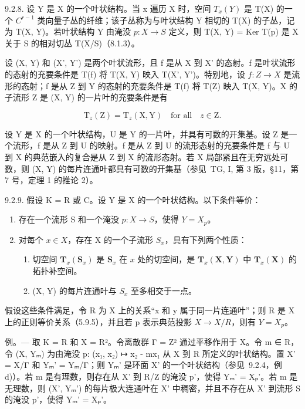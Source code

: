 9.2.8. 设 Y 是 X 的一个叶状结构。当 x 遍历 X 时，空间 \(T_{x}(Y)\) 是 T(X) 的一个 \(C^{r-1}\) 类向量子丛的纤维；该子丛称为与叶状结构 Y 相切的 T(X) 的子丛，记为 T(X, Y)。若叶状结构 Y 由淹没 \(p: X \to S\) 定义，则 T(X, Y) = Ker T(p) 是 X 关于 S 的相对切丛 T(X/S)（8.1.3）。

设 (X, Y) 和 (X', Y') 是两个叶状流形，且 f 是从 X 到 X' 的态射。f 是叶状流形的态射的充要条件是 T(f) 将 T(X, Y) 映入 T(X', Y')。特别地，设 \(f: Z \to X\) 是流形的态射；f 是从 Z 到 Y 的态射的充要条件是 T(f) 将 T(Z) 映入 T(X, Y)。X 的子流形 Z 是 (X, Y) 的一片叶的充要条件是有

\[
\mathrm{T} _ {z} (\mathrm{Z}) = \mathrm{T} _ {z} (\mathrm{X}, \mathrm{Y}) \quad \text {for all} \quad z \in \mathrm{Z}.
\]

设 Y 是 X 的一个叶状结构，U 是 Y 的一片叶，并具有可数的开集基。设 Z 是一个流形，f 是从 Z 到 U 的映射。f 是从 Z 到 U 的流形态射的充要条件是 f 与 U 到 X 的典范嵌入的复合是从 Z 到 X 的流形态射。若 X 局部紧且在无穷远处可数，则 (X, Y) 的每片连通叶都具有可数的开集基（参见~TG, I, 第 3 版，§11，第 7 号，定理 1 的推论 2）。

9.2.9. 假设 K = R 或 C。设 Y 是 X 的一个叶状结构。以下条件等价：

\begin{enumerate}
\def\labelenumi{\alph{enumi})}
\item
  存在一个流形 S 和一个淹没 \(p: X \to S\)，使得 \(Y = X_p\)。
\item
  对每个 \(x \in X\)，存在 X 的一个子流形 \(S_{x}\)，具有下列两个性质：
\begin{enumerate}
\item[\(b_1)\)] 切空间 \(\mathbf{T}_{x}(\mathbf{S}_{x})\) 是 \(\mathbf{S}_{x}\) 在 \(x\) 处的切空间，是 \(\mathbf{T}_{x}(\mathbf{X},\mathbf{Y})\) 中 \(\mathbf{T}_{x}(\mathbf{X})\) 的拓扑补空间。
\item[\(b_2)\)] (X, Y) 的每片连通叶与 \(S_{x}\) 至多相交于一点。
\end{enumerate}
\end{enumerate}

假设这些条件满足，令 R 为 X 上的关系“x 和 y 属于同一片连通叶”；则 R 是 X 上的正则等价关系（5.9.5），并且若 p 表示典范投影 \(X \to X/R\)，则有 \(Y = X_p\)。

例。--- 取 K = R 和 X = R²。令离散群 Γ = Z² 通过平移作用于 X。令 m ∈ R，令 (X, Yₘ) 为由淹没 p: (x₁, x₂) ↦ x₂ - mx₁ 从 X 到 R 所定义的叶状结构。置 X' = X/Γ 和 Yₘ' = Yₘ/Γ；则 Yₘ' 是环面 X' 的一个叶状结构（参见~9.2.4，例 d)）。若 m 是有理数，则存在从 X' 到 R/Z 的淹没 p'，使得 Yₘ' = Xₚ'。若 m 是无理数，则 (X', Yₘ') 的每片极大连通叶在 X' 中稠密，并且不存在从 X' 到流形 S 的淹没 p'，使得 Yₘ' = Xₚ'。

